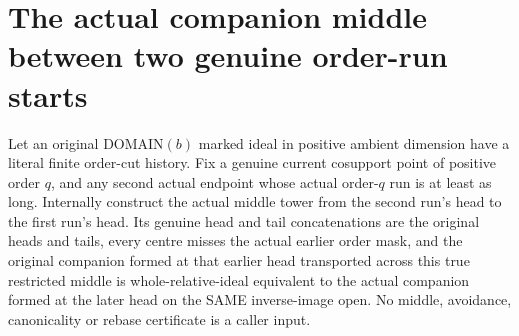 \section{The actual companion middle between two genuine order-run starts}

\begin{theorem}
\label{hir:original-finite-order-cut-actual-middle}
\leanok
Let an original DOMAIN$(b)$ marked ideal in positive ambient dimension
have a literal finite order-cut history. Fix a genuine current cosupport
point of positive order $q$, and any second actual endpoint whose actual
order-$q$ run is at least as long. Internally construct the actual middle
tower from the second run's head to the first run's head. Its genuine head
and tail concatenations are the original heads and tails, every centre
misses the actual earlier order mask, and the original companion formed
at that earlier head transported across this true restricted middle is
whole-relative-ideal equivalent to the actual companion formed at the
later head on the SAME inverse-image open. No middle, avoidance,
canonicality or rebase certificate is a caller input.
\end{theorem}
